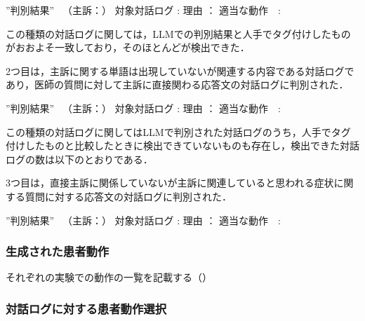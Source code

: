 ”判別結果” 　（主訴：）
  対象対話ログ  :
         理由  ：
    適当な動作　:

この種類の対話ログに関しては，LLMでの判別結果と人手でタグ付けしたものがおおよそ一致しており，そのほとんどが検出できた．

2つ目は，主訴に関する単語は出現していないが関連する内容である対話ログであり，医師の質問に対して主訴に直接関わる応答文の対話ログに判別された．

”判別結果” 　（主訴：）
  対象対話ログ  :
         理由  ：
    適当な動作　:

この種類の対話ログに関してはLLMで判別された対話ログのうち，人手でタグ付けしたものと比較したときに検出できていないものも存在し，検出できた対話ログの数は以下のとおりである．


3つ目は，直接主訴に関係していないが主訴に関連していると思われる症状に関する質問に対する応答文の対話ログに判別された．

”判別結果” 　（主訴：）
  対象対話ログ  :
         理由  ：
    適当な動作　:

\subsubsection*{生成された患者動作}
それぞれの実験での動作の一覧を記載する（）


\subsubsection*{対話ログに対する患者動作選択}
